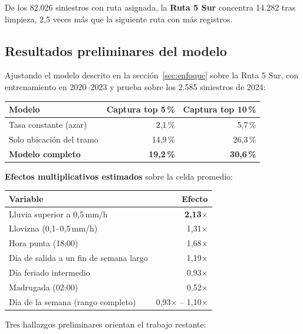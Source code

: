 \documentclass[11pt,a4paper]{article}
\begin{document}
\medskip
De los 82.026 siniestros con ruta asignada, la \textbf{Ruta 5 Sur} concentra
14.282 tras limpieza, 2,5 veces más que la siguiente ruta con más registros.

\subsection{Resultados preliminares del modelo}

Ajustando el modelo descrito en la sección~\ref{sec:enfoque} sobre la Ruta 5
Sur, con entrenamiento en 2020--2023 y prueba sobre los 2.585 siniestros de
2024:

\begin{center}
\begin{tabular}{lrr}
\toprule
\textbf{Modelo} & \textbf{Captura top 5\,\%} & \textbf{Captura top 10\,\%}\\
\midrule
Tasa constante (azar)      & 2,1\,\%  & 5,7\,\%\\
Solo ubicación del tramo   & 14,9\,\% & 26,3\,\%\\
\textbf{Modelo completo}   & \textbf{19,2\,\%} & \textbf{30,6\,\%}\\
\bottomrule
\end{tabular}
\end{center}

\medskip
\noindent\textbf{Efectos multiplicativos estimados} sobre la celda promedio:

\begin{center}
\begin{tabular}{lr}
\toprule
\textbf{Variable} & \textbf{Efecto}\\
\midrule
Lluvia superior a 0,5\,mm/h              & \textbf{2,13$\times$}\\
Llovizna (0,1--0,5\,mm/h)                & 1,31$\times$\\
Hora punta (18:00)                       & 1,68$\times$\\
Día de salida a un fin de semana largo   & 1,19$\times$\\
Día feriado intermedio                   & 0,93$\times$\\
Madrugada (02:00)                        & 0,52$\times$\\
Día de la semana (rango completo)        & 0,93$\times$ -- 1,10$\times$\\
\bottomrule
\end{tabular}
\end{center}

\medskip
Tres hallazgos preliminares orientan el trabajo restante:
\end{document}
